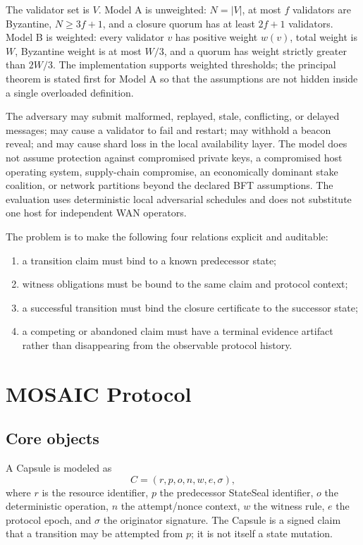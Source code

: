 \documentclass{ledger}
\begin{document}
The validator set is $V$. Model A is unweighted: $N=|V|$, at most $f$ validators are Byzantine, $N\geq 3f+1$, and a closure quorum has at least $2f+1$ validators. Model B is weighted: every validator $v$ has positive weight $w(v)$, total weight is $W$, Byzantine weight is at most $W/3$, and a quorum has weight strictly greater than $2W/3$. The implementation supports weighted thresholds; the principal theorem is stated first for Model A so that the assumptions are not hidden inside a single overloaded definition.

The adversary may submit malformed, replayed, stale, conflicting, or delayed messages; may cause a validator to fail and restart; may withhold a beacon reveal; and may cause shard loss in the local availability layer. The model does not assume protection against compromised private keys, a compromised host operating system, supply-chain compromise, an economically dominant stake coalition, or network partitions beyond the declared BFT assumptions. The evaluation uses deterministic local adversarial schedules and does not substitute one host for independent WAN operators.

The problem is to make the following four relations explicit and auditable:
\begin{enumerate}
\item a transition claim must bind to a known predecessor state;
\item witness obligations must be bound to the same claim and protocol context;
\item a successful transition must bind the closure certificate to the successor state;
\item a competing or abandoned claim must have a terminal evidence artifact rather than disappearing from the observable protocol history.
\end{enumerate}

\section{MOSAIC Protocol}
\subsection{Core objects}
A Capsule is modeled as
\begin{equation}
 C=(r,p,o,n,w,e,\sigma),
\end{equation}
where $r$ is the resource identifier, $p$ the predecessor StateSeal identifier, $o$ the deterministic operation, $n$ the attempt/nonce context, $w$ the witness rule, $e$ the protocol epoch, and $\sigma$ the originator signature. The Capsule is a signed claim that a transition may be attempted from $p$; it is not itself a state mutation.
\end{document}
